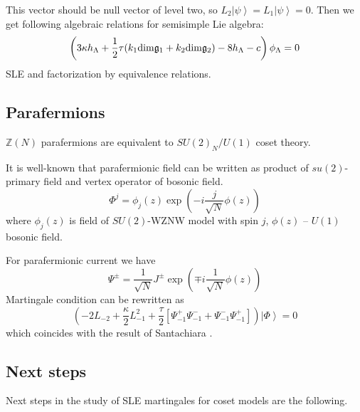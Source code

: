 This vector should be null vector of level two, so $L_{2}\left|\psi\right>=L_{1}\left|\psi\right>=0$. Then we get following algebraic relations for semisimple Lie algebra:
\begin{equation}
  \label{eq:7}
  \left( 3\kappa h_{\Lambda} +\frac{1}{2} \tau (k_{1} \mathrm{dim} \mathfrak{g}_{1}+k_{2}\mathrm{dim} \mathfrak{g}_{2}) -8 h_{\Lambda} - c\right)\phi_{\Lambda}=0
\end{equation}
SLE and factorization by equivalence relations. 

\subsection{Parafermions}

$\mathbb{Z}(N)$ parafermions are equivalent to $SU(2)_{N}/U(1)$ coset theory.

It is well-known that parafermionic field can be written as product of $su(2)$-primary field and vertex operator of bosonic field. 
\begin{equation*}
  \Phi^{j}=\phi_{j}(z) \exp\left( -i \frac{j}{\sqrt{N}}\phi(z)\right)
\end{equation*}
where $\phi_{j}(z)$ is field of $SU(2)$-WZNW model with spin $j$, $\phi(z)$ -- $U(1)$ bosonic field.

For parafermionic current we have
\begin{equation*}
  \Psi^{\pm}=\frac{1}{\sqrt{N}} J^{\pm}\exp\left(\mp i \frac{1}{\sqrt{N}}\phi(z)\right)
\end{equation*}
Martingale condition can be rewritten as
\begin{equation*}
  \left(-2 L_{-2}+\frac{\kappa}{2}L_{-1}^{2}+\frac{\tau}{2}\left[\Psi^{+}_{-1}\Psi^{-}_{-1}+\Psi^{-}_{-1}\Psi^{+}_{-1}\right]\right) \left|\Phi\right>=0
\end{equation*}
which coincides with the result of Santachiara \cite{santachiara2008sle}.



\subsection{Next steps}

Next steps in the study of SLE martingales for coset models  are the following. 


